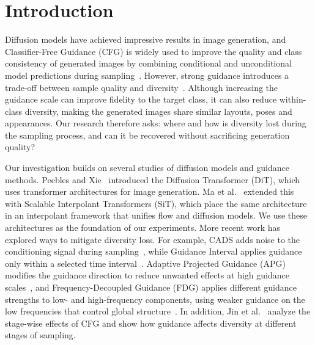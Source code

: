 \documentclass[sigconf,nonacm]{acmart}
\begin{document}

\maketitle

\section{Introduction}
\label{sec:intro}

Diffusion models have achieved impressive results in image generation, and Classifier-Free Guidance (CFG) is widely used to improve the quality and class consistency of generated images by combining conditional and unconditional model predictions during sampling~\cite{ho2022cfg}. However, strong guidance introduces a trade-off between sample quality and diversity~\cite{ho2022cfg}. Although increasing the guidance scale can improve fidelity to the target class, it can also reduce within-class diversity, making the generated images share similar layouts, poses and appearances. Our research therefore asks: where and how is diversity lost during the sampling process, and can it be recovered without sacrificing generation quality?

Our investigation builds on several studies of diffusion models and guidance methods. Peebles and Xie~\cite{peebles2023dit} introduced the Diffusion Transformer (DiT), which uses transformer architectures for image generation. Ma et al.~\cite{ma2024sit} extended this with Scalable Interpolant Transformers (SiT), which place the same architecture in an interpolant framework that unifies flow and diffusion models. We use these architectures as the foundation of our experiments. More recent work has explored ways to mitigate diversity loss. For example, CADS adds noise to the conditioning signal during sampling~\cite{sadat2024cads}, while Guidance Interval applies guidance only within a selected time interval~\cite{kynkaanniemi2024interval}. Adaptive Projected Guidance (APG) modifies the guidance direction to reduce unwanted effects at high guidance scales~\cite{sadat2025apg}, and Frequency-Decoupled Guidance (FDG) applies different guidance strengths to low- and high-frequency components, using weaker guidance on the low frequencies that control global structure~\cite{sadat2025fdg}. In addition, Jin et al.~\cite{jin2026stagewise} analyze the stage-wise effects of CFG and show how guidance affects diversity at different stages of sampling.
\end{document}
